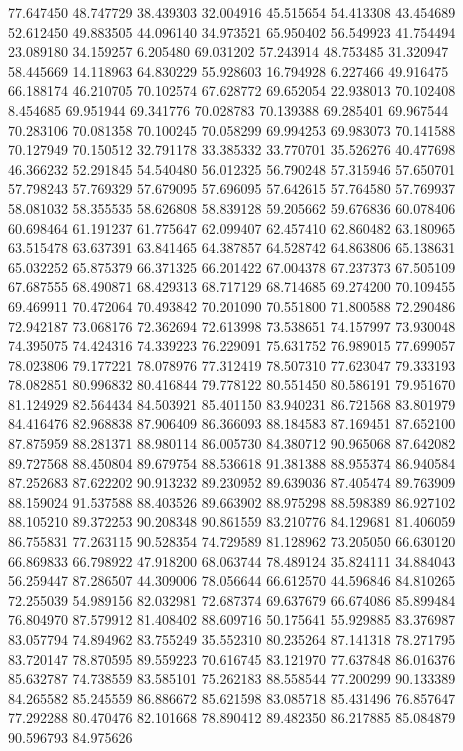 77.647450
48.747729
38.439303
32.004916
45.515654
54.413308
43.454689
52.612450
49.883505
44.096140
34.973521
65.950402
56.549923
41.754494
23.089180
34.159257
6.205480
69.031202
57.243914
48.753485
31.320947
58.445669
14.118963
64.830229
55.928603
16.794928
6.227466
49.916475
66.188174
46.210705
70.102574
67.628772
69.652054
22.938013
70.102408
8.454685
69.951944
69.341776
70.028783
70.139388
69.285401
69.967544
70.283106
70.081358
70.100245
70.058299
69.994253
69.983073
70.141588
70.127949
70.150512
32.791178
33.385332
33.770701
35.526276
40.477698
46.366232
52.291845
54.540480
56.012325
56.790248
57.315946
57.650701
57.798243
57.769329
57.679095
57.696095
57.642615
57.764580
57.769937
58.081032
58.355535
58.626808
58.839128
59.205662
59.676836
60.078406
60.698464
61.191237
61.775647
62.099407
62.457410
62.860482
63.180965
63.515478
63.637391
63.841465
64.387857
64.528742
64.863806
65.138631
65.032252
65.875379
66.371325
66.201422
67.004378
67.237373
67.505109
67.687555
68.490871
68.429313
68.717129
68.714685
69.274200
70.109455
69.469911
70.472064
70.493842
70.201090
70.551800
71.800588
72.290486
72.942187
73.068176
72.362694
72.613998
73.538651
74.157997
73.930048
74.395075
74.424316
74.339223
76.229091
75.631752
76.989015
77.699057
78.023806
79.177221
78.078976
77.312419
78.507310
77.623047
79.333193
78.082851
80.996832
80.416844
79.778122
80.551450
80.586191
79.951670
81.124929
82.564434
84.503921
85.401150
83.940231
86.721568
83.801979
84.416476
82.968838
87.906409
86.366093
88.184583
87.169451
87.652100
87.875959
88.281371
88.980114
86.005730
84.380712
90.965068
87.642082
89.727568
88.450804
89.679754
88.536618
91.381388
88.955374
86.940584
87.252683
87.622202
90.913232
89.230952
89.639036
87.405474
89.763909
88.159024
91.537588
88.403526
89.663902
88.975298
88.598389
86.927102
88.105210
89.372253
90.208348
90.861559
83.210776
84.129681
81.406059
86.755831
77.263115
90.528354
74.729589
81.128962
73.205050
66.630120
66.869833
66.798922
47.918200
68.063744
78.489124
35.824111
34.884043
56.259447
87.286507
44.309006
78.056644
66.612570
44.596846
84.810265
72.255039
54.989156
82.032981
72.687374
69.637679
66.674086
85.899484
76.804970
87.579912
81.408402
88.609716
50.175641
55.929885
83.376987
83.057794
74.894962
83.755249
35.552310
80.235264
87.141318
78.271795
83.720147
78.870595
89.559223
70.616745
83.121970
77.637848
86.016376
85.632787
74.738559
83.585101
75.262183
88.558544
77.200299
90.133389
84.265582
85.245559
86.886672
85.621598
83.085718
85.431496
76.857647
77.292288
80.470476
82.101668
78.890412
89.482350
86.217885
85.084879
90.596793
84.975626
